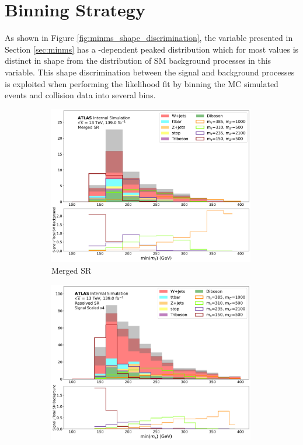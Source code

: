 \section{Binning Strategy}
\label{sec:binning_strategy}

As shown in Figure \ref{fig:minms_shape_discrimination}, the \minms variable presented in Section \ref{sec:minms} has a \ms-dependent peaked distribution which for most \ms values is distinct in shape from the distribution of SM background processes in this variable. This shape discrimination between the signal and background processes is exploited when performing the likelihood fit by binning the MC simulated events and collision data into several \minms bins. 

\begin{figure}[htbp]
  \centering
    \begin{subfigure}[t]{0.48\textwidth}
    \centering
     \includegraphics[width = 0.99\textwidth]{Figures/7/SR1L_Merged/TARJets10_minmS_mgd.pdf}
    \caption{Merged SR}
    \end{subfigure}
    \begin{subfigure}[t]{0.48\textwidth}
    \centering
     \includegraphics[width = 0.99\textwidth]{Figures/7/SR1L_Resolved/TARJets10_minmS_res.pdf}

\end{subfigure}
\end{figure}
